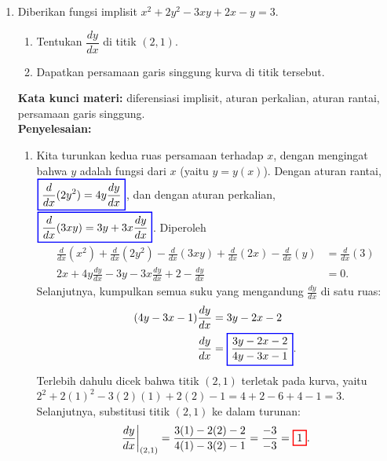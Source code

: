 \documentclass[10pt,openany,a4paper]{article}
\theoremstyle{definition}
\theoremstyle{definition}
\theoremstyle{plain}
\newenvironment{jawab}[2][tes]{%
\par\noindent\textbf{Kata kunci materi:} #1.\\
\textbf{Penyelesaian:} #2%
}{}
\begin{document}
\begin{enumerate}
    \item Diberikan fungsi implisit $x^2+2y^2-3xy+2x-y=3$.
    \begin{enumerate}
        \item Tentukan $\dfrac{dy}{dx}$ di titik $(2,1)$.
        \item Dapatkan persamaan garis singgung kurva di titik tersebut.
    \end{enumerate}
    \begin{jawab}[diferensiasi implisit, aturan perkalian, aturan rantai, persamaan garis singgung]{
        \begin{enumerate}
            \item Kita turunkan kedua ruas persamaan terhadap $x$, dengan mengingat bahwa $y$ adalah fungsi dari $x$ (yaitu $y=y(x)$). Dengan aturan rantai, $\colorlet{oldcolor}{.}
        \color{blue}
        \setlength{\fboxrule}{1pt} \boxed{\color{oldcolor}\frac{d}{dx}(2y^2) = 4y\frac{dy}{dx}}\color{oldcolor}$, dan dengan aturan perkalian, $\colorlet{oldcolor}{.}
        \color{blue}
        \setlength{\fboxrule}{1pt} \boxed{\color{oldcolor}\frac{d}{dx}(3xy) = 3y + 3x\frac{dy}{dx}}\color{oldcolor}$. Diperoleh
            \begin{align*}
                \frac{d}{dx}(x^2) + \frac{d}{dx}(2y^2) - \frac{d}{dx}(3xy) + \frac{d}{dx}(2x) - \frac{d}{dx}(y) &= \frac{d}{dx}(3)\\
                2x + 4y\frac{dy}{dx} - 3y - 3x\frac{dy}{dx} + 2 - \frac{dy}{dx} &= 0.
            \end{align*}
            Selanjutnya, kumpulkan semua suku yang mengandung $\frac{dy}{dx}$ di satu ruas:
            \begin{align*}
                (4y - 3x - 1)\frac{dy}{dx} &= 3y - 2x - 2\\
                \frac{dy}{dx} &= \colorlet{oldcolor}{.}
        \color{blue}
        \setlength{\fboxrule}{1pt} \boxed{\color{oldcolor}\frac{3y - 2x - 2}{4y - 3x - 1}}\color{oldcolor}.
            \end{align*}
            Terlebih dahulu dicek bahwa titik $(2,1)$ terletak pada kurva, yaitu $2^2+2(1)^2-3(2)(1)+2(2)-1=4+2-6+4-1=3$. Selanjutnya, substitusi titik $(2,1)$ ke dalam turunan:
            \begin{align*}
                \frac{dy}{dx}\bigg|_{(2,1)} = \frac{3(1) - 2(2) - 2}{4(1) - 3(2) - 1} = \frac{-3}{-3} = \colorlet{oldcolor}{.}
        \color{red}
        \setlength{\fboxrule}{1pt} \boxed{\color{oldcolor}1}\color{oldcolor}.
            \end{align*}

\end{enumerate}}
\end{jawab}
\end{enumerate}
\end{document}
